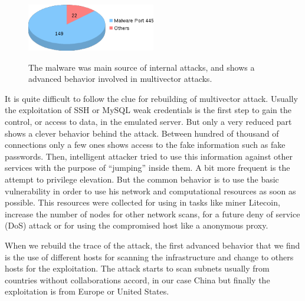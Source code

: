 \documentclass[a4paper]{llncs}
\begin{document}
\begin{figure}[h]
	\includegraphics[width=0.5\textwidth]{internalTypes.png}
	\centering
	\label{fig:internalTypes}
	\caption{The malware was main source of internal attacks, and shows a advanced behavior involved in multivector attacks.}
\end{figure}

It is quite difficult to follow the clue for rebuilding of multivector attack. Usually the exploitation of SSH or MySQL weak credentials is the first step to gain the control, or access to data, in the emulated server. But only a very reduced part shows a clever behavior behind the attack. Between hundred of thousand of connections only a few ones shows access to the fake information such as fake passwords. Then, intelligent attacker tried to use this information against other services with the purpose of  ``jumping'' inside them. A bit more frequent is the attempt to privilege elevation. But the common behavior is to use the basic vulnerability in order to use his network and computational resources as soon as possible. This resources were collected for using in tasks like miner Litecoin\cite{litecoin}, increase the number of nodes for other network scans, for a future deny of service (DoS) attack or for using the compromised host like a anonymous proxy.

When we rebuild the trace of the attack, the first advanced behavior that we find is the use of different hosts for scanning the infrastructure and change to others hosts for the exploitation. The attack starts to scan subnets usually from countries without collaborations accord, in our case China but finally the exploitation is from Europe or United States.
\end{document}

